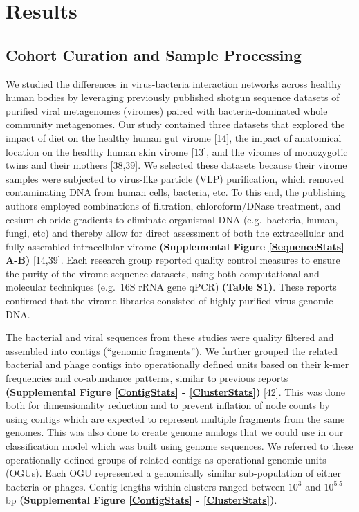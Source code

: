 \documentclass[12pt,]{article}
\begin{document}
\section{Results}\label{results}

\subsection{Cohort Curation and Sample
Processing}\label{cohort-curation-and-sample-processing}

We studied the differences in virus-bacteria interaction networks across
healthy human bodies by leveraging previously published shotgun sequence
datasets of purified viral metagenomes (viromes) paired with
bacteria-dominated whole community metagenomes. Our study contained
three datasets that explored the impact of diet on the healthy human gut
virome {[}14{]}, the impact of anatomical location on the healthy human
skin virome {[}13{]}, and the viromes of monozygotic twins and their
mothers {[}38,39{]}. We selected these datasets because their virome
samples were subjected to virus-like particle (VLP) purification, which
removed contaminating DNA from human cells, bacteria, etc. To this end,
the publishing authors employed combinations of filtration,
chloroform/DNase treatment, and cesium chloride gradients to eliminate
organismal DNA (e.g.~bacteria, human, fungi, etc) and thereby allow for
direct assessment of both the extracellular and fully-assembled
intracellular virome \textbf{(Supplemental Figure \ref{SequenceStats}
A-B)} {[}14,39{]}. Each research group reported quality control measures
to ensure the purity of the virome sequence datasets, using both
computational and molecular techniques (e.g.~16S rRNA gene qPCR)
\textbf{(Table S1)}. These reports confirmed that the virome libraries
consisted of highly purified virus genomic DNA.

The bacterial and viral sequences from these studies were quality
filtered and assembled into contigs (``genomic fragments''). We further
grouped the related bacterial and phage contigs into operationally
defined units based on their k-mer frequencies and co-abundance
patterns, similar to previous reports \textbf{(Supplemental Figure
\ref{ContigStats} - \ref{ClusterStats})} {[}42{]}. This was done both
for dimensionality reduction and to prevent inflation of node counts by
using contigs which are expected to represent multiple fragments from
the same genomes. This was also done to create genome analogs that we
could use in our classification model which was built using genome
sequences. We referred to these operationally defined groups of related
contigs as operational genomic units (OGUs). Each OGU represented a
genomically similar sub-population of either bacteria or phages. Contig
lengths within clusters ranged between \(10^{3}\) and \(10^{5.5}\) bp
\textbf{(Supplemental Figure \ref{ContigStats} - \ref{ClusterStats})}.
\end{document}
